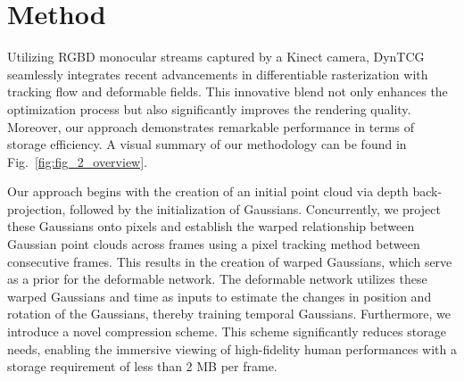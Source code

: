 

\section{Method}\label{sec:algorithm} 
Utilizing RGBD monocular streams captured by a Kinect camera, DynTCG seamlessly integrates recent advancements in differentiable rasterization with tracking flow and deformable fields\cite{yang2023deformable3dgs}. This innovative blend not only enhances the optimization process but also significantly improves the rendering quality. Moreover, our approach demonstrates remarkable performance in terms of storage efficiency. A visual summary of our methodology can be found in Fig.~\ref{fig:fig_2_overview}.

Our approach begins with the creation of an initial point cloud via depth back-projection, followed by the initialization of Gaussians. Concurrently, we project these Gaussians onto pixels and establish the warped relationship between Gaussian point clouds across frames using a pixel tracking method between consecutive frames. This results in the creation of warped Gaussians, which serve as a prior for the deformable network. The deformable network utilizes these warped Gaussians and time as inputs to estimate the changes in position and rotation of the Gaussians, thereby training temporal Gaussians. Furthermore, we introduce a novel compression scheme. This scheme significantly reduces storage needs, enabling the immersive viewing of high-fidelity human performances with a storage requirement of less than 2 MB per frame.

